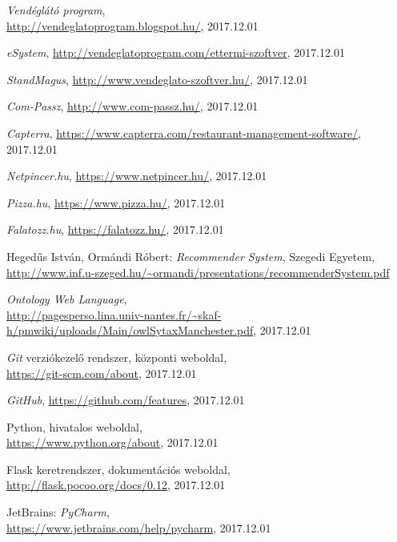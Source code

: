\begin{thebibliography}{x}

\emph{Vendéglátó program}, \\
\url{http://vendeglatoprogram.blogspot.hu/}, 2017.12.01

\emph{eSystem}, \url{http://vendeglatoprogram.com/ettermi-szoftver}, 2017.12.01

\emph{StandMagus}, \url{http://www.vendeglato-szoftver.hu/}, 2017.12.01

\emph{Com-Passz}, \url{http://www.com-passz.hu/}, 2017.12.01


\emph{Capterra}, \url{https://www.capterra.com/restaurant-management-software/}, 2017.12.01

\emph{Netpincer.hu}, \url{https://www.netpincer.hu/}, 2017.12.01

\emph{Pizza.hu}, \url{https://www.pizza.hu/}, 2017.12.01

\emph{Falatozz.hu}, \url{https://falatozz.hu/}, 2017.12.01


Hegedűs István, Ormándi Róbert: \emph{Recommender System}, Szegedi Egyetem, \\ \url{http://www.inf.u-szeged.hu/~ormandi/presentations/recommenderSystem.pdf}

\emph{Ontology Web Language}, \\
\url{http://pagesperso.lina.univ-nantes.fr/~skaf-h/pmwiki/uploads/Main/owlSytaxManchester.pdf}, 2017.12.01

\emph{Git} verziókezelő rendszer, központi weboldal, \\
\url{https://git-scm.com/about}, 2017.12.01

\emph{GitHub}, \url{https://github.com/features}, 2017.12.01


Python, hivatalos weboldal, \\
\url{https://www.python.org/about}, 2017.12.01

Flask keretrendszer, dokumentációs weboldal, \\
\url{http://flask.pocoo.org/docs/0.12}, 2017.12.01

JetBrains: \emph{PyCharm}, \\
\url{https://www.jetbrains.com/help/pycharm}, 2017.12.01



\end{thebibliography}
